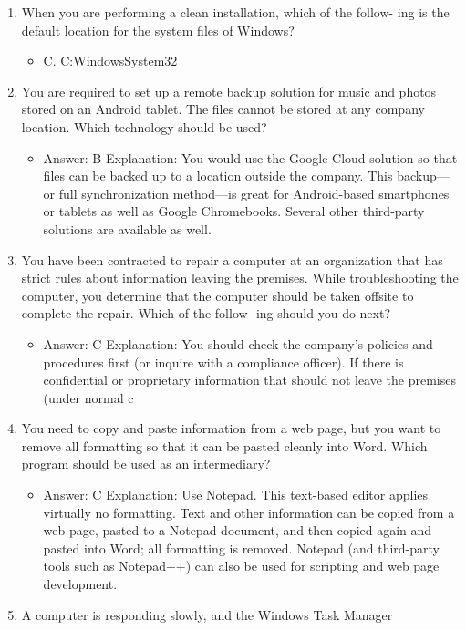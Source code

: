 \documentclass{article}
\begin{document}
\begin{enumerate}
    \item When you are performing a clean installation, which of the follow-
ing is the default location for the system files of Windows?
    \begin{itemize}
        \item C. C:WindowsSystem32
    \end{itemize} 
    \item You are required to set up a remote backup solution for music and
photos stored on an Android tablet. The files cannot be stored at
any company location. Which technology should be used?
    \begin{itemize}
        \item Answer: B
Explanation: You would use the Google Cloud solution so that files can be backed up
to a location outside the company. This backup—or full synchronization method—is
great for Android-based smartphones or tablets as well as Google Chromebooks.
Several other third-party solutions are available as well.
    \end{itemize}
    \item You have been contracted to repair a computer at an organization
that has strict rules about information leaving the premises. While
troubleshooting the computer, you determine that the computer
should be taken offsite to complete the repair. Which of the follow-
ing should you do next?
    \begin{itemize}
        \item Answer: C
Explanation: You should check the company’s policies and procedures first (or inquire
with a compliance officer). If there is confidential or proprietary information that should
not leave the premises (under normal c
    \end{itemize}
    \item You need to copy and paste information from a web page, but you
want to remove all formatting so that it can be pasted cleanly into
Word. Which program should be used as an intermediary?
    \begin{itemize}
        \item Answer: C
Explanation: Use Notepad. This text-based editor applies virtually no formatting. Text
and other information can be copied from a web page, pasted to a Notepad document,
and then copied again and pasted into Word; all formatting is removed. Notepad (and
third-party tools such as Notepad++) can also be used for scripting and web page
development.
    \end{itemize}
    \item A computer is responding slowly, and the Windows Task Manager

\end{enumerate}
\end{document}
